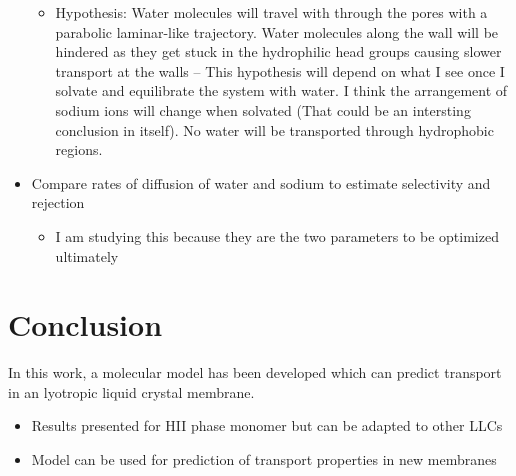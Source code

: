 \documentclass{article}
\begin{document}
\begin{itemize}
\begin{itemize}
		\item Hypothesis: Water molecules will travel with through the pores with a parabolic laminar-like trajectory. Water molecules along the wall will be hindered as they get stuck in the hydrophilic head groups causing slower transport at the walls -- This hypothesis will depend on what I see once I solvate and equilibrate the system with water. I think the arrangement of sodium ions will change when solvated (That could be an intersting conclusion in itself). No water will be transported through hydrophobic regions.    
	\end{itemize}
	\item Compare rates of diffusion of water and sodium to estimate selectivity and rejection
	\begin{itemize}
		\item I am studying this because they are the two parameters to be optimized ultimately
	\end{itemize}
\end{itemize}

\section{Conclusion}

In this work, a molecular model has been developed which can predict transport in an lyotropic liquid crystal membrane. 
\begin{itemize}
	\item Results presented for HII phase monomer but can be adapted to other LLCs
	\item Model can be used for prediction of transport properties in new membranes
\end{itemize}
\end{document}
